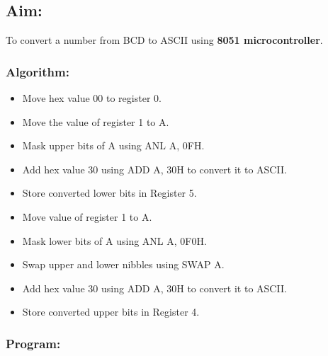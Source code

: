 \documentclass[12pt,a4paper]{article}
\begin{document}
\begin{flushleft}
\subsection*{\textbf{Aim:}} 
To convert a number from BCD to ASCII using \textbf{8051 microcontroller}.

\subsubsection*{\textbf{Algorithm:}}
\begin{itemize}
    \item Move hex value 00 to register 0. 
    \item Move the value of register 1 to A.
    \item Mask upper bits of A using ANL A, 0FH.
    \item Add hex value 30 using ADD A, 30H to convert it to ASCII.
    \item Store converted lower bits in Register 5.
    \item Move value of register 1 to A.
    \item Mask lower bits of A using ANL A, 0F0H.
    \item Swap upper and lower nibbles using SWAP A.
    \item Add hex value 30 using ADD A, 30H to convert it to ASCII.
    \item Store converted upper bits in Register 4.
\end{itemize}

\newpage
\subsubsection*{\textbf{Program:}}


\end{flushleft}
\end{document}
